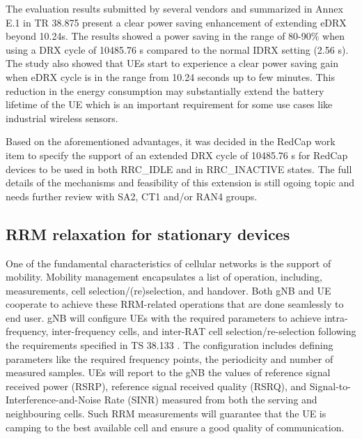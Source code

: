 \documentclass[conference]{IEEEtran}
\begin{document}
The evaluation results submitted by several vendors and summarized in Annex E.1 in TR 38.875 \cite{3gpp.38.875} present a clear power saving enhancement of extending eDRX beyond 10.24s. The results showed a power saving in the range of 80-90$\%$ when using a DRX cycle of 10485.76 s compared to the normal IDRX setting (2.56 s). The study also showed that UEs start to experience a clear power saving gain when eDRX cycle is in the range from 10.24 seconds up to few minutes. This reduction in the energy consumption  may substantially extend the battery lifetime of the UE which is an important requirement for some use cases like industrial wireless sensors.
 
 Based on the aforementioned advantages, it was decided in the RedCap work item to specify the support of an extended DRX cycle of 10485.76 s for RedCap devices to be used in both RRC\_IDLE and in RRC\_INACTIVE states. The full details of the mechanisms and feasibility of this extension is still ogoing topic and needs further review with SA2, CT1 and/or RAN4 groups.



\subsection{RRM relaxation for stationary devices}
\label{sec:5-2}



One of the fundamental characteristics of cellular networks is the support of mobility. Mobility management encapsulates a list of operation, including, measurements, cell selection/(re)selection, and handover. Both gNB and UE cooperate to achieve these RRM-related operations that are done seamlessly to end user. gNB will configure UEs with the required parameters to achieve intra-frequency, inter-frequency cells, and inter-RAT cell selection/re-selection following the requirements specified in TS 38.133 \cite{3gpp.38.133}. The configuration includes defining parameters like the required frequency points, the periodicity and number of measured samples. UEs will report to the gNB the values of reference signal received power (RSRP), reference signal received quality (RSRQ), and Signal-to-Interference-and-Noise Rate (SINR) measured from both the serving and neighbouring cells. Such RRM measurements will guarantee that the UE is camping to the best available cell and ensure a good quality of communication.
\end{document}
